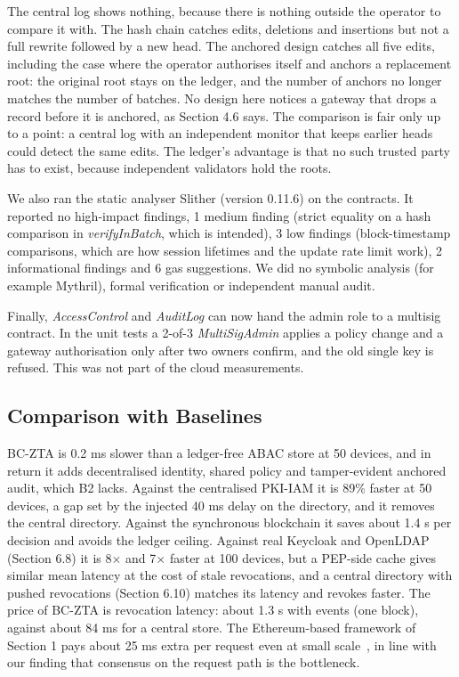 \documentclass[a4paper,5p,times,twocolumn,number,sort&compress]{elsarticle}
\begin{document}
The central log shows nothing, because there is nothing outside the operator to compare it with. The hash chain catches edits, deletions and insertions but not a full rewrite followed by a new head. The anchored design catches all five edits, including the case where the operator authorises itself and anchors a replacement root: the original root stays on the ledger, and the number of anchors no longer matches the number of batches. No design here notices a gateway that drops a record before it is anchored, as Section 4.6 says. The comparison is fair only up to a point: a central log with an independent monitor that keeps earlier heads could detect the same edits. The ledger's advantage is that no such trusted party has to exist, because independent validators hold the roots.

We also ran the static analyser Slither (version 0.11.6) on the contracts. It reported no high-impact findings, 1 medium finding (strict equality on a hash comparison in \emph{verifyInBatch}, which is intended), 3 low findings (block-timestamp comparisons, which are how session lifetimes and the update rate limit work), 2 informational findings and 6 gas suggestions. We did no symbolic analysis (for example Mythril), formal verification or independent manual audit.

Finally, \emph{AccessControl} and \emph{AuditLog} can now hand the admin role to a multisig contract. In the unit tests a 2-of-3 \emph{MultiSigAdmin} applies a policy change and a gateway authorisation only after two owners confirm, and the old single key is refused. This was not part of the cloud measurements.

\subsection{Comparison with Baselines}

BC-ZTA is 0.2 ms slower than a ledger-free ABAC store at 50 devices, and in return it adds decentralised identity, shared policy and tamper-evident anchored audit, which B2 lacks. Against the centralised PKI-IAM it is 89\% faster at 50 devices, a gap set by the injected 40 ms delay on the directory, and it removes the central directory. Against the synchronous blockchain it saves about 1.4 s per decision and avoids the ledger ceiling. Against real Keycloak and OpenLDAP (Section 6.8) it is 8$\times$ and 7$\times$ faster at 100 devices, but a PEP-side cache gives similar mean latency at the cost of stale revocations, and a central directory with pushed revocations (Section 6.10) matches its latency and revokes faster. The price of BC-ZTA is revocation latency: about 1.3 s with events (one block), against about 84 ms for a central store. The Ethereum-based framework of Section 1 pays about 25 ms extra per request even at small scale~\cite{singh}, in line with our finding that consensus on the request path is the bottleneck.
\end{document}
